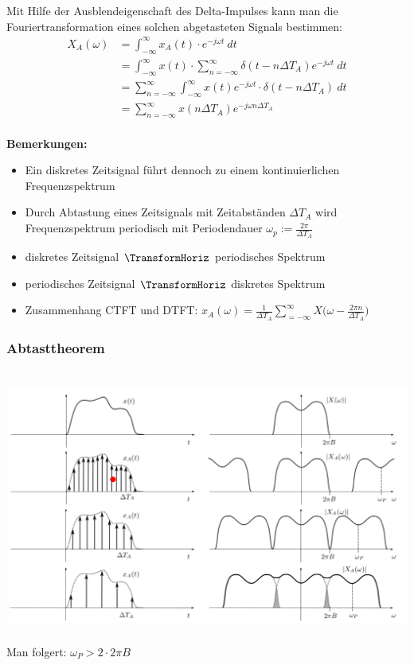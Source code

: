 \documentclass[12pt,a4paper]{scrartcl}
\begin{document}
  \noindent Mit Hilfe der Ausblendeigenschaft des Delta-Impulses kann man die Fouriertransformation eines solchen abgetasteten Signals bestimmen:
  \begin{equation}
    \label{eq:13}
    \begin{split}
      X_A(\omega) &=  \int_{-\infty}^{\infty} x_A(t) \cdot e^{-j \omega t}\ d t \\
      &=  \int_{-\infty}^{\infty} x(t) \cdot \sum_{n = -\infty}^{\infty} \delta (t-n\Delta T_A) e^{-j \omega t}\ d t\\
      &= \sum_{n = -\infty}^{\infty} \int_{-\infty}^{\infty} x(t) e^{-j\omega t} \cdot \delta(t-n\Delta T_A)\ dt\\
      &= \sum_{n=-\infty}^{\infty} x(n\Delta T_A) e^{-j\omega n \Delta T_A}
    \end{split}
  \end{equation} 
  \\
  \noindent  \textbf{Bemerkungen:}
  \begin{itemize}
    \item Ein diskretes Zeitsignal führt dennoch zu einem kontinuierlichen Frequenzspektrum
    \item Durch Abtastung eines Zeitsignals mit Zeitabständen $\Delta T_A$ wird Frequenzspektrum periodisch mit Periodendauer $\omega_p:= \frac{2\pi}{\Delta T_A}$
    \item diskretes Zeitsignal $\TransformHoriz$ periodisches Spektrum
    \item periodisches Zeitsignal $\TransformHoriz$ diskretes Spektrum
    \item Zusammenhang CTFT und DTFT: $x_A(\omega) = \frac{1}{\Delta T_A} \sum_{ =-\infty}^{\infty} X\Big(\omega - \frac{2\pi n}{\Delta T_A}\Big)$
  \end{itemize}

  \subsubsection{Abtasttheorem}
  \label{sec.sub:sub:abtasttheorem}

\includegraphics[height=9cm]{Pictures/Abtasttheorem.png} \\
\noindent Man folgert: $\omega_P > 2 \cdot 2\pi B$
\end{document}
